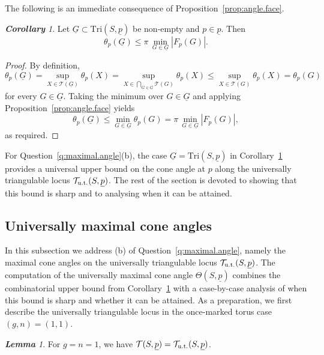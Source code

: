 \documentclass[11pt, letterpaper]{amsart}
\theoremstyle{definition}
\theoremstyle{remark}
\newtheorem{lemma}[theorem]{\rm\bf Lemma}
\newtheorem{corollary}[theorem]{\rm\bf Corollary}
\newcommand{\up}{\underline{p}}
\newcommand{\Sp}{(S,\up)}
\newcommand{\TSp}{\text{Tri}\Sp}
\newcommand{\cT}{\mathcal{T}}
\newcommand{\cTp}{\mathcal{T} (S,\up)}
\numberwithin{equation}{section}
\begin{document}
The following is an immediate consequence of
Proposition~\ref{prop:angle.face}.

\begin{corollary}
\label{cor:angle.supremum}
Let \(\underline{G}\subset\TSp\) be non-empty and \(p\in\up\).
Then
\[
\theta_p(\underline{G})
\leq \pi\,\min_{G\in\underline{G}}|F_p(G)|.
\]
\end{corollary}

\begin{proof}
By definition,
\[
\theta_p(\underline{G})
=\sup_{X\in\cT(\underline{G})}\theta_p(X)
=\sup_{X\in\bigcap_{G\in\underline{G}}\cT(G)}\theta_p(X)
\leq \sup_{X\in\cT(G)}\theta_p(X)
=\theta_p(G)
\]
for every \(G\in\underline{G}\).
Taking the minimum over \(G\in\underline{G}\) and applying
Proposition~\ref{prop:angle.face} yields
\[
\theta_p(\underline{G})
\leq \min_{G\in\underline{G}}\theta_p(G)
=\pi\,\min_{G\in\underline{G}}|F_p(G)|,
\]
as required.
\end{proof}

For Question~\ref{q:maximal.angle}(b), the case \(\underline{G}=\TSp\) in
Corollary~\ref{cor:angle.supremum} provides a universal upper bound on the
cone angle at \(p\) along the universally triangulable locus
\(\cT_{\rm u.t.}(S,\up)\).
The rest of the section is devoted to showing that this bound is sharp and
to analysing when it can be attained.

 \subsection{Universally maximal cone angles}
\label{subsec:universal.max.angle}

In this subsection we address (b) of Question~\ref{q:maximal.angle}, namely the maximal cone angles on the universally triangulable locus \(\cT_{\rm u.t.}(S,\up)\).
The computation of the universally maximal cone angle \(\Theta(S,\up)\) combines the combinatorial upper bound from Corollary~\ref{cor:angle.supremum} with a case-by-case analysis of when this bound is sharp and whether it can be attained.
As a preparation, we first describe the universally triangulable locus in the once-marked torus case \((g,n)=(1,1)\).

\begin{lemma}
\label{lem:n1g1.adm.eq.TS}
For \(g=n=1\), we have \(\cTp=\cT_{\rm u.t.}(S,\up)\).
\end{lemma}
\end{document}

